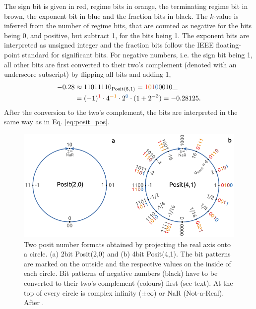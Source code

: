 \documentclass[draft]{agujournal2019}
\newcommand{\op}{\operatorname}
\begin{document}
The sign bit is given in red, regime bits in orange, the terminating regime bit in brown, the exponent bit in blue and the fraction bits in black. The $k$-value is inferred from the number of regime bits, that are counted as negative for the bits being 0, and positive, but subtract 1, for the bits being 1. The exponent bits are interpreted as unsigned integer and the fraction bits follow the IEEE floating-point standard for significant bits. For negative numbers, i.e. the sign bit being 1, all other bits are first converted to their two's complement (denoted with an underscore subscript) by flipping all bits and adding 1,
\begin{equation}
\begin{split}
-0.28 &  \approx 11011110_{\op{Posit}(8,1)} = {\color{psign}1}{\color{pregime}0}{\color{pregimet}1}{\color{pexpo}0}0010\_ \\
& = (-1)^{\color{psign}1} \cdot 4^{\color{pregime}-1} \cdot 2^{\color{pexpo}0} \cdot (1+2^{-3}) = -0.28125.
\end{split}
\label{eq:2comp}
\end{equation}
After the conversion to the two's complement, the bits are interpreted in the same way as in Eq. \ref{eq:posit_pos}.

\begin{figure}[htbp]
\center
\includegraphics[width=1\textwidth]{figs/circles.pdf}
\caption{Two posit number formats obtained by projecting the real axis onto a circle. (a) 2bit Posit(2,0) and (b) 4bit Posit(4,1). The bit patterns are marked on the outside and the respective values on the inside of each circle. Bit patterns of negative numbers (black) have to be converted to their two's complement (colours) first (see text). At the top of every circle is complex infinity ($\pm \infty$) or NaR (Not-a-Real). After . }
\label{fig:circle}
\end{figure}
\end{document}
